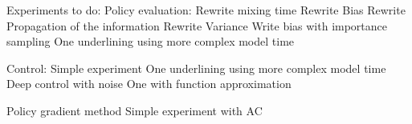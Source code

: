 Experiments to do:
Policy evaluation:
    Rewrite mixing time
    Rewrite Bias
    Rewrite Propagation of the information
    Rewrite Variance
    Write bias with importance sampling
    One underlining using more complex model time 
    

Control:
    Simple experiment
    One underlining using more complex model time
    Deep control with noise
    One with function approximation
    
Policy gradient method
    Simple experiment with AC
    